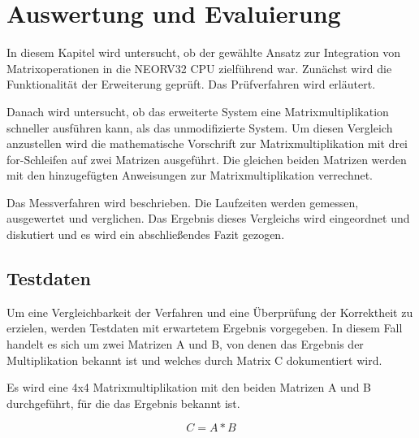 \chapter{Auswertung und Evaluierung} \label{chpt:Auswertung_und_Evaluierung_Main}

In diesem Kapitel wird untersucht, ob der gewählte Ansatz zur Integration von Matrixoperationen in die NEORV32 CPU zielführend war. Zunächst wird die Funktionalität der Erweiterung geprüft. Das Prüfverfahren wird erläutert.

Danach wird untersucht, ob das erweiterte System eine Matrixmultiplikation schneller ausführen kann, als das unmodifizierte System. Um diesen Vergleich anzustellen wird die mathematische Vorschrift zur Matrixmultiplikation mit drei for-Schleifen auf zwei Matrizen ausgeführt. Die gleichen beiden Matrizen werden mit den hinzugefügten Anweisungen zur Matrixmultiplikation verrechnet.

Das Messverfahren wird beschrieben. Die Laufzeiten werden gemessen, ausgewertet und verglichen. Das Ergebnis dieses Vergleichs wird eingeordnet und diskutiert und es wird ein abschließendes Fazit gezogen.




\section{Testdaten} \label{sec:testdata}

Um eine Vergleichbarkeit der Verfahren und eine Überprüfung der Korrektheit zu erzielen, werden Testdaten mit erwartetem Ergebnis vorgegeben. In diesem Fall handelt es sich um zwei Matrizen A und B, von denen das Ergebnis der Multiplikation bekannt ist und welches durch Matrix C dokumentiert wird.

Es wird eine 4x4 Matrixmultiplikation mit den beiden Matrizen A und B durchgeführt, für die das Ergebnis bekannt ist.

\begin{equation}
    C = A * B
\end{equation}



